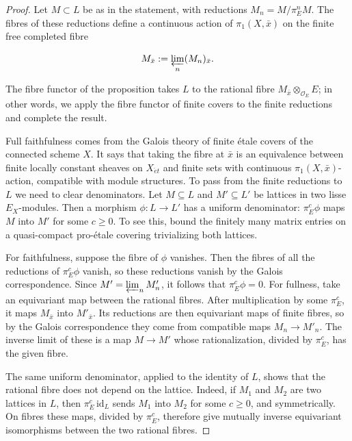 \documentclass[11pt]{article}
\begin{document}
\begin{proof}[{Proof}]\label{bp35}%
Let \(M\subset L\) be as in the statement, with reductions \(M_n=M/\pi_E^nM\). The fibres of these reductions define a continuous action of \(\pi_1(X,\bar x)\) on the finite free completed fibre

\[
M_{\bar x}:=\varprojlim_n(M_n)_{\bar x}.
\]

The fibre functor of the proposition takes \(L\) to the rational fibre \(M_{\bar x}\otimes_{\mathcal O_E}E\); in other words, we apply the fibre functor of finite covers to the finite reductions and complete the result.

Full faithfulness comes from the Galois theory of finite étale covers of the connected scheme \(X\). It says that taking the fibre at \(\bar x\) is an equivalence between finite locally constant sheaves on \(X_{\acute{e}t}\) and finite sets with continuous \(\pi_1(X,\bar x)\)-action, compatible with module structures. To pass from the finite reductions to \(L\) we need to clear denominators. Let \(M\subseteq L\) and \(M'\subseteq L'\) be lattices in two lisse \(E_X\)-modules. Then a morphism \(\phi:L\to L'\) has a uniform denominator: \(\pi_E^c\phi\) maps \(M\) into \(M'\) for some \(c\geq0\). To see this, bound the finitely many matrix entries on a quasi-compact pro-étale covering trivializing both lattices.

For faithfulness, suppose the fibre of \(\phi\) vanishes. Then the fibres of all the reductions of \(\pi_E^c\phi\) vanish, so these reductions vanish by the Galois correspondence. Since \(M'=\varprojlim_nM'_n\), it follows that \(\pi_E^c\phi=0\). For fullness, take an equivariant map between the rational fibres. After multiplication by some \(\pi_E^c\), it maps \(M_{\bar x}\) into \(M'_{\bar x}\). Its reductions are then equivariant maps of finite fibres, so by the Galois correspondence they come from compatible maps \(M_n\to M'_n\). The inverse limit of these is a map \(M\to M'\) whose rationalization, divided by \(\pi_E^c\), has the given fibre.

The same uniform denominator, applied to the identity of \(L\), shows that the rational fibre does not depend on the lattice. Indeed, if \(M_1\) and \(M_2\) are two lattices in \(L\), then \(\pi_E^c\,\mathrm{id}_{L}\) sends \(M_1\) into \(M_2\) for some \(c\geq0\), and symmetrically. On fibres these maps, divided by \(\pi_E^c\), therefore give mutually inverse equivariant isomorphisms between the two rational fibres.


\end{proof}
\end{document}
